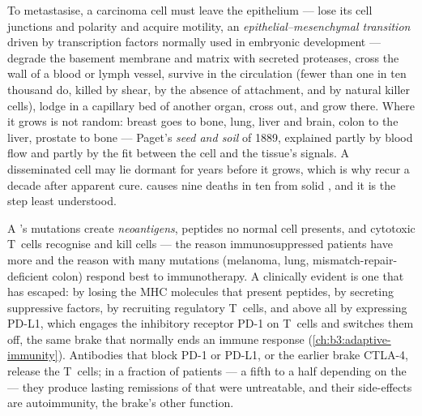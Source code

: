 \begin{definition}\label{def:b3:cancer-biology:metastasis}
To metastasise, a carcinoma cell must leave the epithelium --- lose its
cell junctions and polarity and acquire motility, an
\emph{epithelial--mesenchymal transition} driven by transcription
factors normally used in embryonic development --- degrade the basement
membrane and matrix with secreted proteases, cross the wall of a blood
or lymph vessel, survive in the circulation (fewer than one in ten
thousand do, killed by shear, by the absence of attachment, and by
natural killer cells), lodge in a capillary bed of another organ, cross
out, and grow there. Where it grows is not random: breast  goes to
bone, lung, liver and brain, colon  to the liver, prostate 
to bone --- Paget's \emph{seed and soil} of 1889, explained partly by
blood flow and partly by the fit between the cell and the tissue's
signals. A disseminated cell may lie dormant for years before it grows,
which is why  recur a decade after apparent cure. 
causes nine deaths in ten from solid , and it is the step least
understood.
\end{definition}

\begin{proposition}\label{prop:b3:cancer-biology:immune}
A 's mutations create \emph{neoantigens}, peptides no normal cell
presents, and cytotoxic T~cells recognise and kill  cells --- the
reason immunosuppressed patients have more  and the reason
 with many mutations (melanoma, lung, mismatch-repair-deficient
colon) respond best to immunotherapy. A clinically evident  is
one that has escaped: by losing the MHC molecules that present
peptides, by secreting suppressive factors, by recruiting regulatory
T~cells, and above all by expressing PD-L1, which engages the
inhibitory receptor PD-1 on T~cells and switches them off, the same
brake that normally ends an immune response
(\cref{ch:b3:adaptive-immunity}). Antibodies that block PD-1 or PD-L1,
or the earlier brake CTLA-4, release the T~cells; in a fraction of
patients --- a fifth to a half depending on the  --- they produce
lasting remissions of  that were untreatable, and their
side-effects are autoimmunity, the brake's other function.
\end{proposition}

